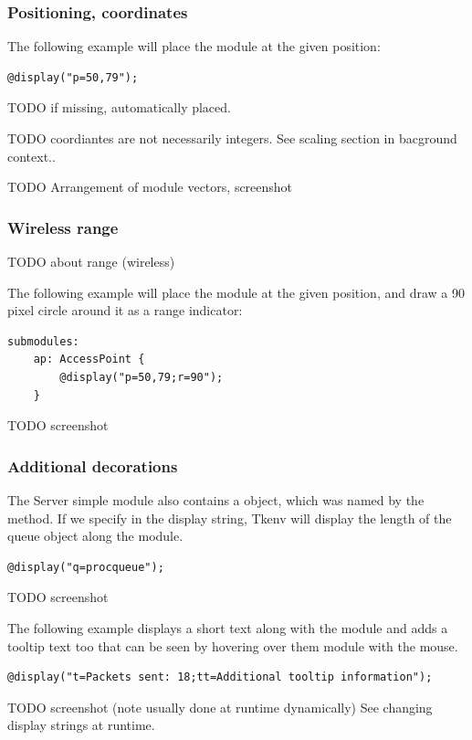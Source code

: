 \subsubsection{Positioning, coordinates}

The following example will place the module at the given position:
\begin{verbatim}
@display("p=50,79");
\end{verbatim}

TODO if missing, automatically placed.

TODO coordiantes are not necessarily integers. See scaling section in bacground context..

TODO Arrangement of module vectors, screenshot

\subsubsection{Wireless range}
TODO about range (wireless)

The following example will place the module at the given position,
and draw a 90 pixel circle around it as a range indicator:
\begin{verbatim}
submodules:
    ap: AccessPoint {
        @display("p=50,79;r=90");
    }
\end{verbatim}

TODO screenshot

\subsubsection{Additional decorations}
The Server simple module also contains a  object,
which was named by the 
method. If we specify  in the display string, Tkenv will display the length
of the queue object along the module.
\begin{verbatim}
@display("q=procqueue");
\end{verbatim}
TODO screenshot

The following example displays a short text along with the module
and adds a tooltip text too that can be seen by hovering over
them module with the mouse.

\begin{verbatim}
@display("t=Packets sent: 18;tt=Additional tooltip information");
\end{verbatim}

TODO screenshot (note usually done at runtime dynamically) See changing display strings at runtime.

